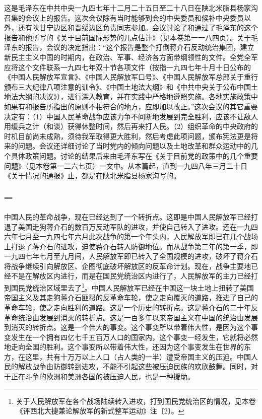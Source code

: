 \documentclass[cn,11pt,chinese]{elegantbook}
\def\myformat#1{\hfil\hfil #1}
\begin{document}
\begin{introduction}\item  这是毛泽东在中共中央一九四七年十二月二十五日至二十八日在陕北米脂县杨家沟召集的会议上的报告。这次会议除有当时能够到会的中央委员和候补中央委员以外，还有陕甘宁边区和晋绥边区负责同志参加。会议讨论了和通过了毛泽东的这个报告和他所写的《关于目前国际形势的几点估计》（见本卷第一一八四页）。关于毛泽东的报告，会议的决定指出：“这个报告是整个打倒蒋介石反动统治集团，建立新民主主义中国的时期内，在政治、军事、经济各方面带纲领性的文件。全党全军应将这个文件联系一九四七年双十节各项文件（按指一九四七年十月十日公布的《中国人民解放军宣言》、《中国人民解放军口号》、《中国人民解放军总部关于重行颁布三大纪律八项注意的训令》、《中国土地法大纲》和《中共中央关于公布中国土地法大纲的决议》），进行深入教育，并在实践中严格地遵照实施。各地实施政策中如果有和报告所指出的原则不相符合的地方，应即加以改正。”这次会议的其它重要决定有：（1）中国人民革命战争应该力争不间断地发展到完全胜利，应该不让敌人用缓兵之计（和谈）获得休整时间，然后再来打人民。（2）组织革命的中央政府的时机目前尚未成熟，须待我军取得更大胜利，然后考虑此项问题，颁布宪法更是将来的问题。会议还详细讨论了当时党内的倾向问题以及土地改革和群众运动中的几个具体政策问题。讨论的结果后来由毛泽东写在《关于目前党的政策中的几个重要问题》（见本卷第一二六七页）一文中。从本篇起，直到一九四八年三月二十日《关于情况的通报》止，都是在陕北米脂县杨家沟写的。\end{introduction}
\subsubsection*{\myformat{一}}
中国人民的革命战争，现在已经达到了一个转折点。这即是中国人民解放军已经打退了美国走狗蒋介石的数百万反动军队的进攻，并使自己转入了进攻。还在一九四六年七月至一九四七年六月此次战争的第一个年头内，人民解放军即已在几个战场上打退了蒋介石的进攻，迫使蒋介石转入防御地位。而从战争第二年的第一季，即一九四七年七月至九月间，人民解放军即已转入了全国规模的进攻，破坏了蒋介石将战争继续引向解放区、企图彻底破坏解放区的反革命计划。现在，战争主要地已经不是在解放区内进行，而是在国民党统治区内进行了，人民解放军的主力已经打到国民党统治区域里去了\footnote[1]{ 关于人民解放军在各个战场陆续转入进攻，打到国民党统治区的情况，见本卷《评西北大捷兼论解放军的新式整军运动》注〔2〕。}。中国人民解放军已经在中国这一块土地上扭转了美国帝国主义及其走狗蒋介石匪帮的反革命车轮，使之走向覆灭的道路，推进了自己的革命车轮，使之走向胜利的道路。这是一个历史的转折点。这是蒋介石的二十年反革命统治由发展到消灭的转折点。这是一百多年以来帝国主义在中国的统治由发展到消灭的转折点。这是一个伟大的事变。这个事变所以带着伟大性，是因为这个事变发生在一个拥有四亿七千五百万人口的国家内，这个事变一经发生，它就将必然地走向全国的胜利。这个事变所以带着伟大性，还因为这个事变发生在世界的东方，在这里，共有十万万以上人口（占人类的一半）遭受帝国主义的压迫。中国人民的解放战争由防御转到进攻，不能不引起这些被压迫民族的欢欣鼓舞。同时，对于正在斗争的欧洲和美洲各国的被压迫人民，也是一种援助。\\
\end{document}
